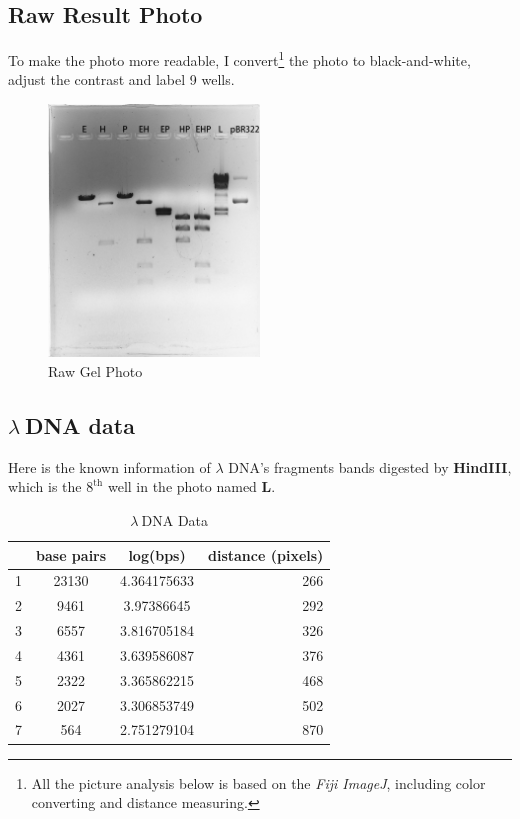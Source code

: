 \documentclass{article}
\begin{document}
        \subsection{Raw Result Photo}
            To make the photo more readable, I convert\footnote{All the picture analysis below is based on the \textit{Fiji ImageJ}, including color converting and distance measuring.}
            the photo to black-and-white, adjust the contrast and label 9 wells.
            \begin{figure}[H]
                \centering
                \includegraphics[width = 0.5\textwidth]{../Data/xun_and_sam.png}
                \caption{Raw Gel Photo}
            \end{figure}

        \subsection{\boldmath$\lambda\ $\unboldmath DNA data}
            Here is the known information of $\lambda$ DNA's fragments bands digested by \textbf{HindIII}, which is the $8^{\text{th}}$ well in the photo named {\bf{L}}.

            \begin{table}[H]
                \caption{$\lambda\ $DNA Data}
                \begin{center}\begin{tabular}{|l|c|c|r|}
                    \hline
                    &base pairs&log(bps)&distance (pixels)\\
                    \hline
                    1&      23130&4.364175633&266\\
                    2&      9461&3.97386645&292\\
                    3&      6557&3.816705184&326\\
                    4&      4361&3.639586087&376\\
                    5&      2322&3.365862215&468\\
                    6&      2027&3.306853749&502\\
                    7&      564&2.751279104&870\\
                    \hline
                \end{tabular}\end{center}
                \label{l.data}
            \end{table}
\end{document}
